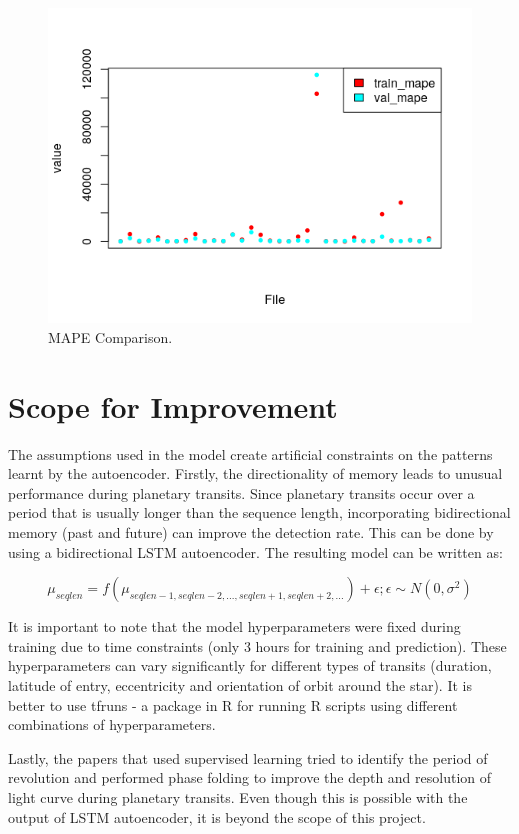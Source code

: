 \documentclass[%
aip,
amsmath,amssymb,
reprint,%
]{revtex4-1}
\begin{document}
\begin{figure}[h!]
	\includegraphics[width=\linewidth]{mape.png}
	\caption{MAPE Comparison.}
	\label{fig:mape}
\end{figure}

\section{Scope for Improvement}

The assumptions used in the model create artificial constraints on the patterns learnt by the autoencoder. Firstly, the directionality of memory leads to unusual performance during planetary transits. Since planetary transits occur over a period that is usually longer than the sequence length, incorporating bidirectional memory (past and future) can improve the detection rate. This can be done by using a bidirectional LSTM autoencoder. The resulting model can be written as:

$$\mu_{seqlen} = f(\mu_{seqlen-1,seqlen-2, ..., seqlen+1, seqlen+2, ...}) + \epsilon; \epsilon \sim N(0, \sigma^2)$$

It is important to note that the model hyperparameters were fixed during training due to time constraints (only 3 hours for training and prediction). These hyperparameters can vary significantly for different types of transits (duration, latitude of entry, eccentricity and orientation of orbit around the star). It is better to use tfruns - a package in R for running R scripts using different combinations of hyperparameters.

Lastly, the papers that used supervised learning tried to identify the period of revolution and performed phase folding to improve the depth and resolution of light curve during planetary transits. Even though this is possible with the output of LSTM autoencoder, it is beyond the scope of this project.
\end{document}
